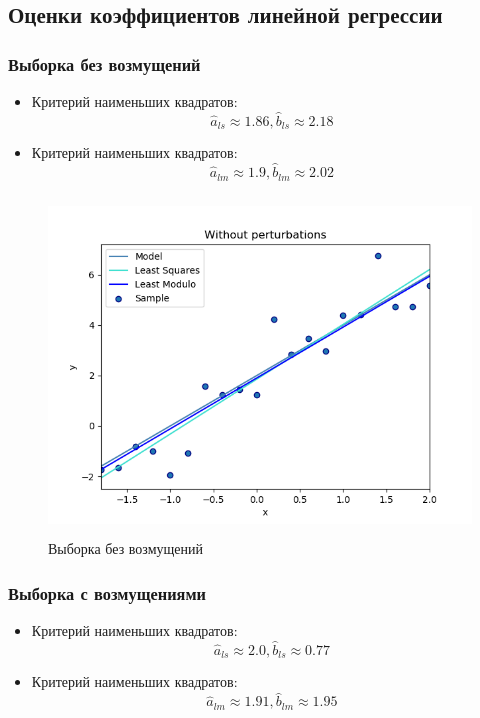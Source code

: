 \documentclass[../body.tex]{subfiles}
\begin{document}
		\subsection{Оценки коэффициентов линейной регрессии}
		\subsubsection{Выборка без возмущений}
		\begin{itemize}
			\item Критерий наименьших квадратов: $$\hat{a}_{ls} \approx 1.86, \hat{b}_{ls} \approx 2.18$$
			\item Критерий наименьших квадратов: $$\hat{a}_{lm} \approx 1.9, \hat{b}_{lm} \approx 2.02$$
		\end{itemize}
	
		\begin{figure}[H]
		\centering
		\includegraphics[width = 12cm, height = 9cm]{img/Without perturbations.png}
		\caption{Выборка без возмущений}
		\label{without}
	\end{figure}

	\subsubsection{Выборка с возмущениями}
	\begin{itemize}
		\item Критерий наименьших квадратов: $$\hat{a}_{ls} \approx 2.0, \hat{b}_{ls} \approx 0.77$$
		\item Критерий наименьших квадратов: $$\hat{a}_{lm} \approx 1.91, \hat{b}_{lm} \approx 1.95$$
	\end{itemize}
	
\end{document}
